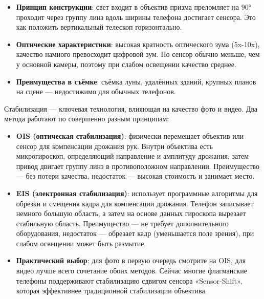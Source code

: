 \begin{itemize}
  \item \textbf{Принцип конструкции}: свет входит в объектив призма преломляет на 90° проходит через группу линз вдоль ширины телефона достигает сенсора. Это как положить вертикальный телескоп горизонтально.
  \item \textbf{Оптические характеристики}: высокая кратность оптического зума (5x-10x), качество намного превосходит цифровой зум. Но сенсор обычно меньше, чем у основной камеры, поэтому при слабом освещении качество среднее.
  \item \textbf{Преимущества в съёмке}: съёмка луны, удалённых зданий, крупных планов на сцене — недостижимо для обычных телефонов.
\end{itemize}


Стабилизация — ключевая технология, влияющая на качество фото и видео. Два метода работают по совершенно разным принципам:

\begin{itemize}
  \item \textbf{OIS (оптическая стабилизация)}: физически перемещает объектив или сенсор для компенсации дрожания рук. Внутри объектива есть микрогироскоп, определяющий направление и амплитуду дрожания, затем привод двигает группу линз в противоположном направлении. Преимущество — без потери качества, недостаток — высокая стоимость и занимает место.
  \item \textbf{EIS (электронная стабилизация)}: использует программные алгоритмы для обрезки и смещения кадра для компенсации дрожания. Телефон записывает немного большую область, а затем на основе данных гироскопа вырезает стабильную область. Преимущество — не требует дополнительного оборудования, недостаток — обрезает кадр (уменьшается поле зрения), при слабом освещении может быть размытие.
  \item \textbf{Практический выбор}: для фото в первую очередь смотрите на OIS, для видео лучше всего сочетание обоих методов. Сейчас многие флагманские телефоны поддерживают стабилизацию сдвигом сенсора «Sensor-Shift», которая эффективнее традиционной стабилизации объектива.
\end{itemize}


